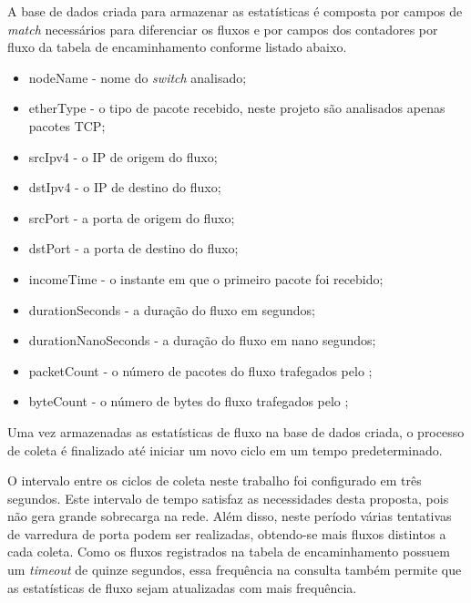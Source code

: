 A base de dados criada para armazenar as estatísticas é composta por campos de \textit{match} necessários para diferenciar os fluxos e por campos dos contadores por fluxo da tabela de encaminhamento conforme listado abaixo.

\begin{itemize}
    \item nodeName - nome do \textit{switch} analisado;
    \item etherType - o tipo de pacote recebido, neste projeto são analisados apenas pacotes TCP;
    \item srcIpv4 - o IP de origem do fluxo;
    \item dstIpv4 - o IP de destino do fluxo;
    \item srcPort - a porta de origem do fluxo;
    \item dstPort - a porta de destino do fluxo;
    \item incomeTime - o instante em que o primeiro pacote foi recebido;
    \item durationSeconds - a duração do fluxo em segundos;
    \item durationNanoSeconds - a duração do fluxo em nano segundos;
    \item packetCount - o número de pacotes do fluxo trafegados pelo ;
    \item byteCount - o número de bytes do fluxo trafegados pelo ;
\end{itemize}

Uma vez armazenadas as estatísticas de fluxo na base de dados criada, o processo de coleta é finalizado até iniciar um novo ciclo em um tempo predeterminado.

O intervalo entre os ciclos de coleta neste trabalho foi configurado em três segundos.  Este intervalo de tempo satisfaz as necessidades desta proposta, pois não gera grande sobrecarga na rede. Além disso, neste período várias tentativas de varredura de porta podem ser realizadas, obtendo-se mais fluxos distintos a cada coleta. Como os fluxos registrados na tabela de encaminhamento possuem um \textit{timeout} de quinze segundos, essa frequência na consulta também permite que as estatísticas de fluxo sejam atualizadas com mais frequência.